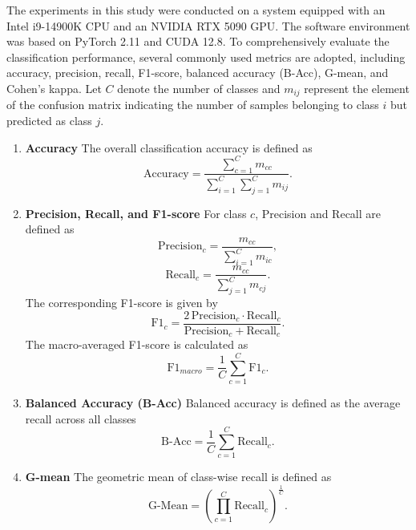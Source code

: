 \documentclass[journal]{IEEEtran}
\begin{document}
The experiments in this study were conducted on a system equipped with an Intel i9-14900K CPU and an NVIDIA RTX 5090 GPU. The software environment was based on PyTorch 2.11 and CUDA 12.8. To comprehensively evaluate the classification performance, several commonly used metrics are adopted, including accuracy, precision, recall, F1-score, balanced accuracy (B-Acc), G-mean, and Cohen’s kappa. Let $C$ denote the number of classes and $m_{ij}$ represent the element of the confusion matrix indicating the number of samples belonging to class $i$ but predicted as class $j$.
\begin{enumerate}
	\item \textbf{Accuracy}
	The overall classification accuracy is defined as
	\begin{equation}
		\mathrm{Accuracy} =
		\frac{\sum_{c=1}^{C} m_{cc}}
		{\sum_{i=1}^{C}\sum_{j=1}^{C} m_{ij}}.
	\end{equation}
	\item \textbf{Precision, Recall, and F1-score}
	For class $c$, Precision and Recall are defined as
	\begin{equation}
		\mathrm{Precision}_c =
		\frac{m_{cc}}
		{\sum_{i=1}^{C} m_{ic}},
	\end{equation}
	\begin{equation}
		\mathrm{Recall}_c =
		\frac{m_{cc}}
		{\sum_{j=1}^{C} m_{cj}}.
	\end{equation}
	The corresponding F1-score is given by
	\begin{equation}
		\mathrm{F1}_c =
		\frac{2\,\mathrm{Precision}_c \cdot \mathrm{Recall}_c}
		{\mathrm{Precision}_c + \mathrm{Recall}_c}.
	\end{equation}
	The macro-averaged F1-score is calculated as
	\begin{equation}
		\mathrm{F1}_{macro} =
		\frac{1}{C}\sum_{c=1}^{C}\mathrm{F1}_c.
	\end{equation}
	\item \textbf{Balanced Accuracy (B-Acc)}
	Balanced accuracy is defined as the average recall across all classes
	\begin{equation}
		\mathrm{B\text{-}Acc} =
		\frac{1}{C}\sum_{c=1}^{C}\mathrm{Recall}_c.
	\end{equation}
	\item \textbf{G-mean}
	The geometric mean of class-wise recall is defined as
	\begin{equation}
		\mathrm{G\text{-}Mean} =
		\left(\prod_{c=1}^{C}\mathrm{Recall}_c\right)^{\frac{1}{C}}.
	\end{equation}

\end{enumerate}
\end{document}
